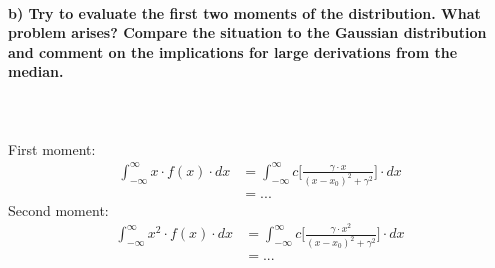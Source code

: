 \newpage
\paragraph{b) Try to evaluate the first two moments of the distribution.
    What problem arises? Compare the situation to the Gaussian 
    distribution and comment on the implications for large derivations
    from the median.
} \ \\
\\
    First moment:
    \begin{align}
        \int_{-\infty}^\infty x\cdot f(x)\cdot dx
        &=\int_{-\infty}^\infty c\bigg[
            \frac{\gamma\cdot x}{(x-x_0)^2+\gamma^2}
        \bigg]\cdot dx \\
        &=...
    \end{align}
    Second moment:
    \begin{align}
        \int_{-\infty}^\infty x^2\cdot f(x)\cdot dx
        &=\int_{-\infty}^\infty c\bigg[
            \frac{\gamma\cdot x^2}{(x-x_0)^2+\gamma^2}
        \bigg]\cdot dx \\
        &=...
    \end{align}
